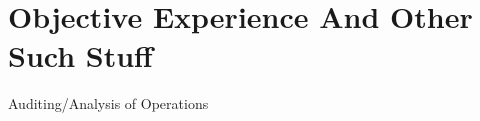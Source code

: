 \documentclass{nfriend-resume}
\begin{document}
 

\MakeHeader
  
\section{Objective Experience And Other Such Stuff}
Auditing/Analysis of Operations
\end{document}
